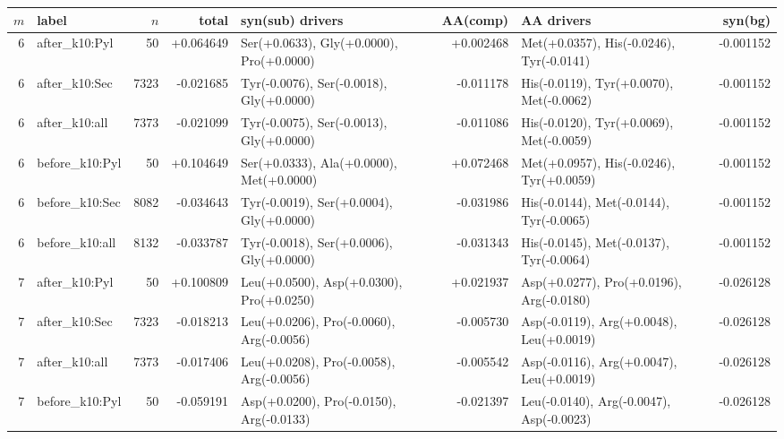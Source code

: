 \begingroup
{}
\scriptsize
\setlength{\tabcolsep}{2pt}
\renewcommand{\arraystretch}{1.10}
\setlength{\LTleft}{0pt}
\setlength{\LTright}{0pt}
\begin{longtable}{r >{\raggedright\arraybackslash}p{1.9cm} r r >{\raggedright\arraybackslash}p{3.7cm} r >{\raggedright\arraybackslash}p{3.7cm} r}
\toprule
$m$ & label & $n$ & total & syn(sub) drivers & AA(comp) & AA drivers & syn(bg) \\
\midrule
6 & after\_\allowbreak{}k10:\allowbreak{}Pyl & 50 & +0.064649 & Ser(+0.0633), Gly(+0.0000), Pro(+0.0000) & +0.002468 & Met(+0.0357), His(-0.0246), Tyr(-0.0141) & -0.001152 \\
6 & after\_\allowbreak{}k10:\allowbreak{}Sec & 7323 & -0.021685 & Tyr(-0.0076), Ser(-0.0018), Gly(+0.0000) & -0.011178 & His(-0.0119), Tyr(+0.0070), Met(-0.0062) & -0.001152 \\
6 & after\_\allowbreak{}k10:\allowbreak{}all & 7373 & -0.021099 & Tyr(-0.0075), Ser(-0.0013), Gly(+0.0000) & -0.011086 & His(-0.0120), Tyr(+0.0069), Met(-0.0059) & -0.001152 \\
6 & before\_\allowbreak{}k10:\allowbreak{}Pyl & 50 & +0.104649 & Ser(+0.0333), Ala(+0.0000), Met(+0.0000) & +0.072468 & Met(+0.0957), His(-0.0246), Tyr(+0.0059) & -0.001152 \\
6 & before\_\allowbreak{}k10:\allowbreak{}Sec & 8082 & -0.034643 & Tyr(-0.0019), Ser(+0.0004), Gly(+0.0000) & -0.031986 & His(-0.0144), Met(-0.0144), Tyr(-0.0065) & -0.001152 \\
6 & before\_\allowbreak{}k10:\allowbreak{}all & 8132 & -0.033787 & Tyr(-0.0018), Ser(+0.0006), Gly(+0.0000) & -0.031343 & His(-0.0145), Met(-0.0137), Tyr(-0.0064) & -0.001152 \\
7 & after\_\allowbreak{}k10:\allowbreak{}Pyl & 50 & +0.100809 & Leu(+0.0500), Asp(+0.0300), Pro(+0.0250) & +0.021937 & Asp(+0.0277), Pro(+0.0196), Arg(-0.0180) & -0.026128 \\
7 & after\_\allowbreak{}k10:\allowbreak{}Sec & 7323 & -0.018213 & Leu(+0.0206), Pro(-0.0060), Arg(-0.0056) & -0.005730 & Asp(-0.0119), Arg(+0.0048), Leu(+0.0019) & -0.026128 \\
7 & after\_\allowbreak{}k10:\allowbreak{}all & 7373 & -0.017406 & Leu(+0.0208), Pro(-0.0058), Arg(-0.0056) & -0.005542 & Asp(-0.0116), Arg(+0.0047), Leu(+0.0019) & -0.026128 \\
7 & before\_\allowbreak{}k10:\allowbreak{}Pyl & 50 & -0.059191 & Asp(+0.0200), Pro(-0.0150), Arg(-0.0133) & -0.021397 & Leu(-0.0140), Arg(-0.0047), Asp(-0.0023) & -0.026128 \\

\end{longtable}
